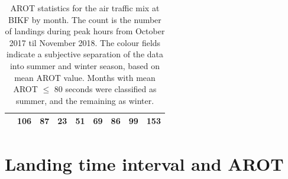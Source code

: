 \begin{table}[h]
{\begin{tabular}{lr|r|r|r|r|r|r|r|}
\rowcolor[HTML]{DAE8FC} 
\multicolumn{1}{|l|}{\cellcolor[HTML]{DAE8FC}December} & 106 & 87 & 23 & 51 & 69 & 86 & 99 & 153 \\ \hline
\end{tabular}%
}
\caption[AROTs for the air traffic mix by month]{AROT statistics for the air traffic mix at BIKF by month. The count is the number of landings during peak hours from October 2017 til November 2018. The colour fields indicate a subjective separation of the data into summer and winter season, based on mean AROT value. Months with mean AROT $\leq$ 80 seconds were classified as summer, and the remaining as winter.}
\label{tab:month2season_arot}
\end{table}

\clearpage
\chapter{Landing time interval and AROT}\label{app:lti_and_arot}



\begin{table}[h]
\centering
{}
\caption[RECAT-EU time-based separation minima]{RECAT-EU WT time-based separation minima on approach and departure~\cite{rooseleer2015recat}}
\label{tab:RECAT-time}
\end{table}



